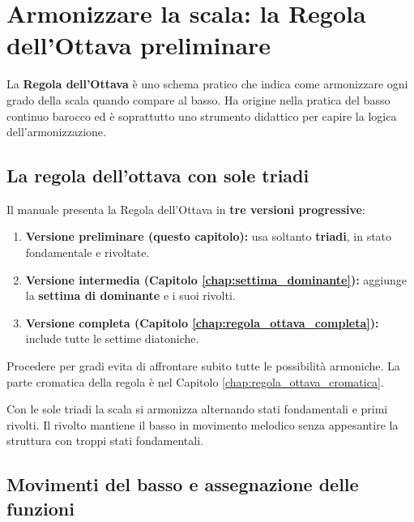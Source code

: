 \chapter{Armonizzare la scala: la Regola dell'Ottava preliminare}
\label{chap:ottava_preliminare}

La \textbf{Regola dell'Ottava} è uno schema pratico che indica come armonizzare ogni grado della scala quando compare al basso. Ha origine nella pratica del basso continuo barocco ed è soprattutto uno strumento didattico per capire la logica dell'armonizzazione.

\section{La regola dell'ottava con sole triadi}
\label{sec:regola_ottava_funzioni}

\begin{definizione}
	\label{def:versioni_regola_ottava}
	Il manuale presenta la Regola dell'Ottava in \textbf{tre versioni progressive}:
	\begin{enumerate}
		\item \textbf{Versione preliminare (questo capitolo):} usa soltanto \textbf{triadi}, in stato fondamentale e rivoltate.
		\item \textbf{Versione intermedia (Capitolo \ref{chap:settima_dominante}):} aggiunge la \textbf{settima di dominante} e i suoi rivolti.
		\item \textbf{Versione completa (Capitolo \ref{chap:regola_ottava_completa}):} include tutte le settime diatoniche.
	\end{enumerate}
	Procedere per gradi evita di affrontare subito tutte le possibilità armoniche. La parte cromatica della regola è nel Capitolo \ref{chap:regola_ottava_cromatica}.
\end{definizione}

Con le sole triadi la scala si armonizza alternando stati fondamentali e primi rivolti. Il rivolto mantiene il basso in movimento melodico senza appesantire la struttura con troppi stati fondamentali.

\section{Movimenti del basso e assegnazione delle funzioni}
\label{subsec:principio_regola_ottava}

